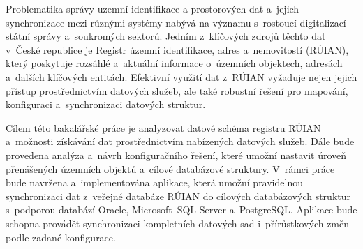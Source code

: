 Problematika správy uzemní identifikace a prostorových dat a~jejich synchronizace mezi různými systémy 
nabývá na významu s~rostoucí digitalizací státní správy a~soukromých sektorů. 
Jedním z~klíčových zdrojů těchto dat v~České republice je Registr územní identifikace, 
adres a~nemovitostí (RÚIAN), který poskytuje rozsáhlé a~aktuální informace o~územních 
objektech, adresách a~dalších klíčových entitách. Efektivní využití dat z~RÚIAN vyžaduje 
nejen jejich přístup prostřednictvím datových služeb, ale také robustní řešení pro mapování, 
konfiguraci a~synchronizaci datových struktur.

Cílem této bakalářské práce je analyzovat datové schéma registru RÚIAN a~možnosti získávání 
dat prostřednictvím nabízených datových služeb. Dále bude provedena analýza a~návrh konfiguračního 
řešení, které umožní nastavit úroveň přenášených územních objektů a~cílové databázové struktury. 
V~rámci práce bude navržena a~implementována aplikace, která umožní pravidelnou synchronizaci dat 
z~veřejné databáze RÚIAN do cílových databázových struktur s~podporou databází Oracle, 
Microsoft~SQL Server a~PostgreSQL. Aplikace bude schopna provádět synchronizaci kompletních datových 
sad i~přírůstkových změn podle zadané konfigurace.